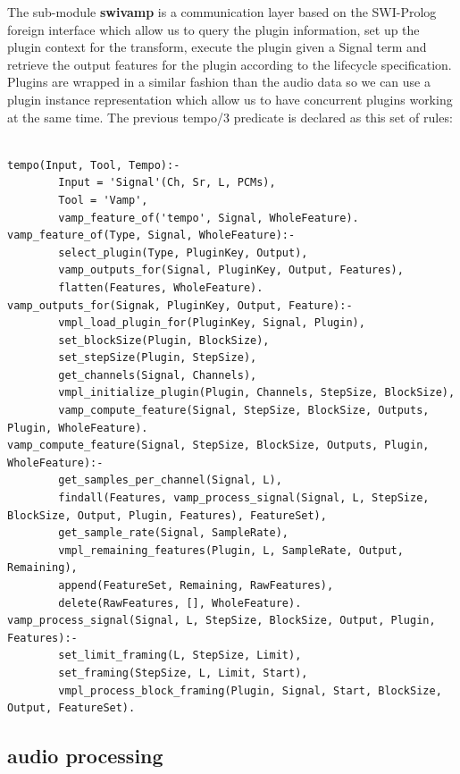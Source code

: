 \documentclass[runningheads]{llncs}
\begin{document}
The sub-module \textbf{swivamp} is a communication layer based on the SWI-Prolog foreign interface which allow us to query the plugin information, set up the plugin context for the transform, execute the plugin given a Signal term and retrieve the output features for the plugin according to the lifecycle specification. Plugins are wrapped in a similar fashion than the audio data so we can use a plugin instance representation which allow us to have concurrent plugins working at the same time. The previous tempo/3 predicate is declared as this set of rules:

\medskip

\noindent

\begin{verbatim}

tempo(Input, Tool, Tempo):-
        Input = 'Signal'(Ch, Sr, L, PCMs),
        Tool = 'Vamp',
        vamp_feature_of('tempo', Signal, WholeFeature).
vamp_feature_of(Type, Signal, WholeFeature):-
        select_plugin(Type, PluginKey, Output),
        vamp_outputs_for(Signal, PluginKey, Output, Features),
        flatten(Features, WholeFeature).
vamp_outputs_for(Signak, PluginKey, Output, Feature):-
        vmpl_load_plugin_for(PluginKey, Signal, Plugin),
        set_blockSize(Plugin, BlockSize),
        set_stepSize(Plugin, StepSize),
        get_channels(Signal, Channels),
        vmpl_initialize_plugin(Plugin, Channels, StepSize, BlockSize),
        vamp_compute_feature(Signal, StepSize, BlockSize, Outputs, Plugin, WholeFeature).
vamp_compute_feature(Signal, StepSize, BlockSize, Outputs, Plugin, WholeFeature):-
        get_samples_per_channel(Signal, L),
        findall(Features, vamp_process_signal(Signal, L, StepSize, BlockSize, Output, Plugin, Features), FeatureSet),
        get_sample_rate(Signal, SampleRate),
        vmpl_remaining_features(Plugin, L, SampleRate, Output, Remaining),
        append(FeatureSet, Remaining, RawFeatures),
        delete(RawFeatures, [], WholeFeature).
vamp_process_signal(Signal, L, StepSize, BlockSize, Output, Plugin, Features):-
        set_limit_framing(L, StepSize, Limit),
        set_framing(StepSize, L, Limit, Start),
        vmpl_process_block_framing(Plugin, Signal, Start, BlockSize, Output, FeatureSet).

\end{verbatim}
\noindent

\subsection{audio processing}\label{subsec:swilasdpa}
\end{document}
